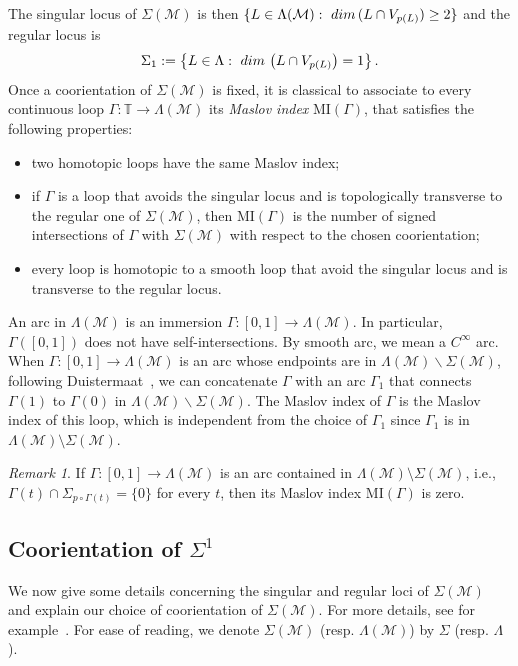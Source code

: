 \documentclass[10pt,a4paper]{amsart}
\numberwithin{equation}{section}
\newcommand*\M{\mathcal{M}}
\newcommand*\cm{\mathcal{M}}
\newcommand*\cal{\mathcal}
\newcommand{\MI}{\mathrm{MI}}
\newcommand*\T{\mathbb{T}}
\renewcommand*\dim{{\rm dim}\,}
\theoremstyle{definition}
\theoremstyle{remark}
\newtheorem{rema}[theo]{Remark}
\begin{document}
The singular locus of $\Sigma(\cal M)$ is then $\{ L\in\Lambda(\cal M) :\ \dim(L\cap V_{p(L)})\geq 2 \}$ and the regular locus is
\begin{equation}\label{Esinglocus}
\Sigma_1:=\left\{ L\in\Lambda :\ \dim\left(L\cap V_{p(L)}\right)=1 \right\}.
\end{equation}
Once a coorientation of $\Sigma(\cal M)$ is fixed, it is classical to associate to every continuous loop $\Gamma:\T\rightarrow \Lambda (\cal M)$ its \emph{Maslov index} $\MI(\Gamma)$, that satisfies the following properties:
\begin{itemize}
\item two homotopic loops have the same Maslov index;
\item if $\Gamma$ is a loop that avoids the singular locus and is topologically transverse to the regular one of $\Sigma(\cal M)$, then $\MI(\Gamma)$ is the number of signed intersections of $\Gamma$ with $\Sigma(\cal M)$ with respect to the chosen coorientation;
\item every loop is homotopic to a smooth loop that avoid the singular locus and is transverse to the regular locus.
\end{itemize}
An arc in $\Lambda(\cal M)$ is an immersion $\Gamma:[0,1]\to\Lambda(\cal M)$. In particular, $\Gamma([0,1])$ does not have self-intersections. By smooth arc, we mean a $C^\infty$ arc. When $\Gamma: [0, 1]\rightarrow \Lambda(\cal M)$ is an arc whose endpoints are in $\Lambda(\M)\backslash \Sigma(\M)$, following Duistermaat~\cite[p.~183]{Dui76}, we can concatenate $\Gamma$ with an arc $\Gamma_1$ that connects $\Gamma (1)$ to $\Gamma(0)$ in $\Lambda(\M)\backslash \Sigma(\M)$. The Maslov index of $\Gamma$ is the Maslov index of this loop, which is independent from the choice of $\Gamma_1$ { since $\Gamma_1$ is in $\Lambda(\M)\setminus\Sigma(\M)$}.


\begin{rema}\label{rmq path transverse}
If $\Gamma:[0,1]\to\Lambda(\cm)$ is an arc contained in $\Lambda(\cm)\setminus\Sigma(\cm)$, i.e., $\Gamma(t)\cap\Sigma_{p\circ\Gamma(t)}=\{0\}$ for every $t$, then its Maslov index $\MI(\Gamma)$ is zero.
\end{rema}

\subsection{Coorientation of \texorpdfstring{$\Sigma^1$}{Sigma1}}\label{subsec defi MI}


We now give some details concerning the singular and regular loci of $\Sigma (\cal M)$ and explain our choice of coorientation of $\Sigma(\cal M)$. For more details, see for example~\cite{Dui76}. For ease of reading, we denote $\Sigma (\cal M)$ (resp. $\Lambda(\cal M)$) by $\Sigma$ (resp. $\Lambda$).
\end{document}
